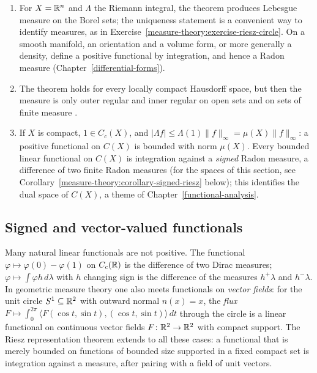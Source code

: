 \begin{remark}\label{measure-theory:remark-riesz-markov}
\begin{enumerate}
\item For $X = \mathbb{R}^n$ and $\Lambda$ the Riemann integral, the theorem produces Lebesgue measure on the Borel sets; the uniqueness statement is a convenient way to identify measures, as in
Exercise~\ref{measure-theory:exercise-riesz-circle}. On a smooth manifold, an orientation and a volume form, or more generally a density, define a positive functional by integration, and hence a
Radon measure (Chapter~\ref{differential-forms}).
\item The theorem holds for every locally compact Hausdorff space, but then the measure is only outer regular and inner regular on open sets and on sets of finite measure
\cite[Theorem 2.14 and Theorem 2.18]{rudin-rca}.
\item If $X$ is compact, $1 \in C_c(X)$, and $|\Lambda f| \leq \Lambda(1)\|f\|_\infty = \mu(X)\|f\|_\infty$: a positive functional on $C(X)$ is bounded with norm $\mu(X)$. Every bounded linear functional on
$C(X)$ is integration against a \emph{signed} Radon measure, a difference of two finite Radon measures \cite[Theorem 6.19]{rudin-rca} (for the spaces of this section, see Corollary~\ref{measure-theory:corollary-signed-riesz}
below); this identifies the dual space of $C(X)$, a theme of
Chapter~\ref{functional-analysis}.
\end{enumerate}
\end{remark}

\subsection{Signed and vector-valued functionals}\label{measure-theory:subsection-riesz-vector}

Many natural linear functionals are not positive. The functional $\varphi \mapsto \varphi(0) - \varphi(1)$ on $C_c(\mathbb{R})$ is the difference of two Dirac measures; $\varphi \mapsto \int\varphi h\,d\lambda$ with $h$
changing sign is the difference of the measures $h^+\lambda$ and $h^-\lambda$. In geometric measure theory one also meets functionals on \emph{vector fields}: for the unit circle $S^1 \subseteq \mathbb{R}^2$ with
outward normal $n(x) = x$, the \emph{flux} $F \mapsto \int_0^{2\pi}\langle F(\cos t, \sin t), (\cos t, \sin t)\rangle\,dt$ through the circle is a linear functional on continuous vector fields $F \colon \mathbb{R}^2 \to \mathbb{R}^2$ with compact support. The
Riesz representation theorem extends to all these cases: a functional that is merely bounded on functions of bounded size supported in a fixed compact set is integration against a measure, after pairing with
a field of unit vectors.

